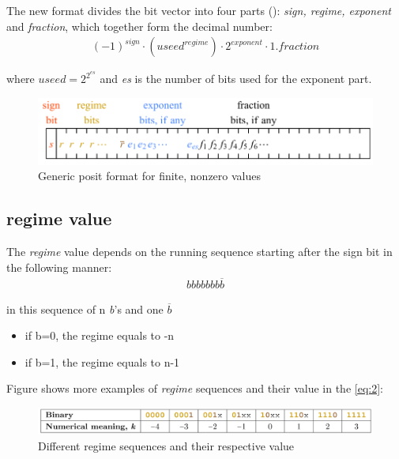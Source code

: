 \documentclass[10pt]{article}
\begin{document}
The new format divides the bit vector into four parts ():
\textit{sign, regime, exponent} and \textit{fraction}, which together form the
decimal number:
\begin{align}
{(-1)}^{sign} \cdot ({useed}^{regime}) \cdot {2}^{exponent} \cdot 1.fraction \label{eq:2}
\end{align}

\noindent{}where $useed = 2^{2^{es}}$ and \textit{es} is the number of bits used for the exponent part.

\begin{figure}[h]
  \centering
  \includegraphics*[width=\textwidth]{POSIT_format}
  \caption{Generic posit format for finite, nonzero values}\label{fig:posit_format}
\end{figure}

\subsection{regime value}\label{sec:regime-value}

The \textit{regime} value depends on the running sequence starting after the sign bit in the
following manner:
\begin{align*}
  bbbbbbb\overline{b}
\end{align*}

\noindent{}in this sequence of n \textit{b}'s and one \textit{$\overline{b}$}
\begin{itemize}
  \item if b=0, the regime equals to -n
  \item if b=1, the regime equals to n-1
\end{itemize}
Figure  shows more examples of \textit{regime} sequences and their
value in the \autoref{eq:2}:

\begin{figure}[h]
  \centering
  \includegraphics[width=\textwidth, height=0.04\paperheight]{regime_values}
  \caption{Different regime sequences and their respective value}\label{fig:regime_values}
\end{figure}
\end{document}
